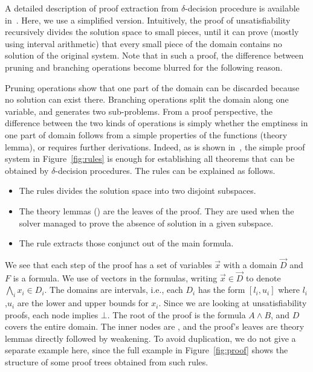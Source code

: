 A detailed description of proof extraction from $\delta$-decision procedure is available in~\cite{DBLP:conf/synasc/GaoKC14}.
Here, we use a simplified version. Intuitively, the proof of unsatisfiability recursively divides the solution space to small pieces, until it can prove (mostly using interval arithmetic) that every small piece of the domain contains no solution of the original system. Note that in such a proof, the difference between pruning and branching operations become blurred for the following reason.

Pruning operations show that one part of the domain can be discarded because no solution can exist there. Branching operations split the domain along one variable, and generates two sub-problems. From a proof perspective, the difference between the two kinds of operations is simply whether the emptiness in one part of domain follows from a simple properties of the functions (theory lemma), or requires further derivations. Indeed, as is shown in~\cite{DBLP:conf/synasc/GaoKC14}, the simple proof system in Figure~\ref{fig:rules} is enough for establishing all theorems that can be obtained by $\delta$-decision procedures. The rules can be explained as follows. 
\begin{itemize}
\item The \splt rules divides the solution space into two disjoint subspaces.
\item The theory lemmas (\thLem) are the leaves of the proof. They are used when the solver managed to prove the absence of solution in a given subspace.
\item The \weaken rule extracts those conjunct out of the main formula.
\end{itemize}
We see that each step of the proof has a set of variables $\vec x$ with a domain $\vec D$ and $F$ is a formula. We use of vectors in the formulas, writing $\vec x ∈ \vec D$ to denote $\bigwedge_i x_i ∈ D_i$. The domains are intervals, i.e., each $D_i$ has the form $[l_i,u_i]$ where $l_i$,$u_i$ are the lower and upper bounds for $x_i$. Since we are looking at unsatisfiability proofs, each node implies $⊥$. The root of the proof is the formula $A ∧ B$, and $D$ covers the entire domain. The inner nodes are \splt, and the proof's leaves are theory lemmas directly followed by weakening. To avoid duplication, we do not give a separate example here, since the full example in Figure~\ref{fig:proof} shows the structure of some proof trees obtained from such rules. 

